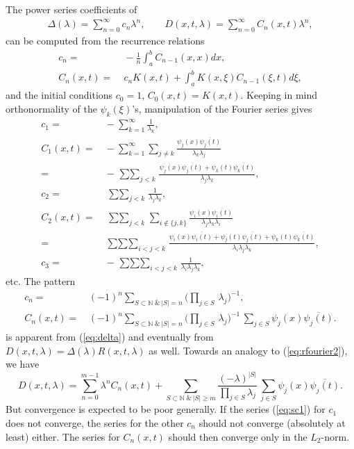 \documentclass{article}
\newcommand{\NN}{\mathbb{N}}
\begin{document}
The power series coefficients of 
\begin{align}
\Delta(\lambda) =\sum_{n=0}^{\infty} c_n\lambda^n, \qquad
D(x,t,\lambda)= \sum_{n=0}^{\infty} C_n(x,t)\lambda^n,
\end{align} 
can be computed \cite[(4.2.9)--(4.2.13a)]{Kanwal} from the recurrence relations
\begin{align}
c_n = &\; -\frac{1}{n}\int_a^b C_{n-1}(x,x)dx,\\
C_n(x,t)= &\; c_nK(x,t)+\int_a^b K(x,\xi)C_{n-1}(\xi,t)d\xi,
\end{align} 
and the initial conditions $c_0=1$, $C_0(x,t)=K(x,t)$. 
Keeping in mind orthonormality of the $\psi_k(\xi)$'s, manipulation of the Fourier series gives
\begin{align} \label{eq:sc1}
c_1 = &\,  -\sum_{k=1}^{\infty} \frac{1}{\lambda_k}, \\
C_1(x,t)=  &\, -\sum_{k=1}^{\infty} \sum_{j\neq k}  \frac{\psi_j(x)\overline{\psi_j(t)}}{\lambda_k\lambda_j} \\
=&\, -\mathop{\sum\sum}_{j<k} 
\frac{\psi_j(x)\overline{\psi_j(t)}+\psi_k(t)\overline{\psi_k(t)}}{\lambda_j\lambda_k}, \\ %
c_2 = & \;  \mathop{\sum\sum}_{j<k}  \frac{1}{\lambda_j\lambda_k}, \\
C_2(x,t)=   &\;  \mathop{\sum\sum}_{j<k} \! \sum_{i\not\in\{j,k\}} 
\frac{\psi_i(x)\overline{\psi_i(t)}}{\lambda_j\lambda_k\lambda_i} \\
= &\, \mathop{\sum\sum\sum}_{i<j<k} 
\frac{\psi_i(x)\overline{\psi_i(t)}+\psi_j(t)\overline{\psi_j(t)}+\psi_k(t)\overline{\psi_k(t)}}{\lambda_i\lambda_j\lambda_k}, 
\\ %
c_3 = & \, - \mathop{\sum\sum\sum}_{i<j<k}  \frac{1}{\lambda_i\lambda_j\lambda_k},
\end{align} 
etc. The pattern
\begin{align}
c_n = &\,  (-1)^n \! \sum_{S\subset \NN\;\&\,|S|=n} \Big(\prod_{j\in S} \, \lambda_j\Big)^{-1}, \\
C_n(x,t)=  &\, (-1)^n \! \sum_{S\subset \NN\;\&\,|S|=n} \Big(\prod_{j\in S} \, \lambda_j\Big)^{-1}
\, \sum_{j\in S} \psi_j(x)\overline{\psi_j(t)}.
\end{align} 
is apparent from (\ref{eq:delta}) and eventually from $D(x,t,\lambda)=\Delta(\lambda)R(x,t,\lambda)$ as well.
Towards an analogy to (\ref{eq:rfourier2}), we have
\begin{equation} \label{eq:fredhr}
D(x,t,\lambda)=\sum_{n=0}^{m-1} \lambda^{n}C_n(x,t)+ \!\!
\sum_{S\subset\NN\;\&\,|S|\ge m} \frac{(-\lambda)^{|S|}}{\prod_{j\in S} \lambda_j} \, \sum_{j\in S} \psi_j(x)\overline{\psi_j(t)}.
\end{equation}
But convergence is expected to be poor generally.
If the series (\ref{eq:sc1}) for $c_1$ does not converge, the series for the other $c_n$ 
should not converge (absolutely at least) either.
The series for $C_n(x,t)$ should then converge only in the $L_2$-norm. %
\end{document}
